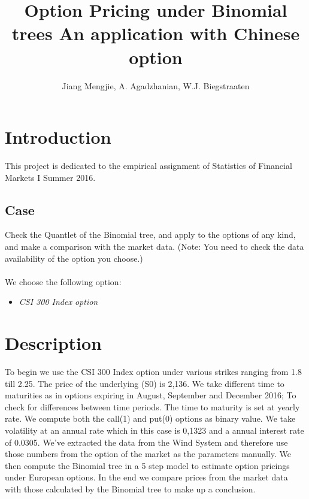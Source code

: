 \documentclass[11pt, titlepage]{article}
\author{Jiang Mengjie, A. Agadzhanian, W.J. Biegstraaten}
\title{Option Pricing under Binomial trees \endgraf\bigskip
\large An application with Chinese option}
\date{\parbox{\linewidth}\centering{20-07-2016} \endgraf\bigskip
By project group 14}
\begin{document}
	\maketitle
    \setcounter{tocdepth}{1}
 
 \Large \tableofcontents

    \newpage
    \section{Introduction}
    This project is dedicated to the empirical assignment of Statistics of Financial Markets I Summer 2016.
    \subsection{Case}
   	Check the Quantlet of the Binomial tree, and apply to the options of any kind, and make a comparison with the market data. (Note: You need to check the data availability of the option you choose.)
    \\
    \\
    We choose the following option:
    \begin{itemize}
    \item \textit{CSI 300 Index option}
    \end{itemize}
    \bigskip
    \section{Description}
    To begin we use the CSI 300 Index option under various strikes ranging from 1.8 till 2.25. The price of the underlying (S0) is 2,136.  We take different time to maturities as in options expiring in August, September and December 2016; To check for differences between time periods. The time to maturity is set at yearly rate. We compute both the call(1) and put(0) options as binary value. We take volatility at an annual rate which in this case is 0,1323 and a annual interest rate of 0.0305. We've extracted the data from the Wind System and therefore use those numbers from the option of the market as the parameters manually. We then compute the Binomial tree in a 5 step model to estimate option pricings under European options. In the end we compare prices from the market data with those calculated by the Binomial tree to make up a conclusion.

\newpage
\end{document}
